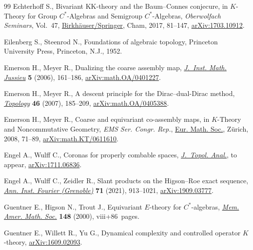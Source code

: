\documentclass[pdftex]{sigma}
\numberwithin{equation}{section}
\theoremstyle{definition}
\begin{document}
\begin{thebibliography}{99}
Echterhoff S., Bivariant {KK}-theory and the {B}aum--{C}onnes conjecure, in
 {$K$}-Theory for Group {$C^*$}-Algebras and Semigroup {$C^*$}-Algebras,
 \textit{Oberwolfach Seminars}, Vol.~47, \href{https://doi.org/10.1007/978-3-319-59915-1_3}{Birkh\"auser/Springer}, Cham, 2017,
 81--147, \href{https://arxiv.org/abs/1703.10912}{arXiv:1703.10912}.

Eilenberg S., Steenrod N., Foundations of algebraic topology, Princeton
 University Press, Princeton, N.J., 1952.

Emerson H., Meyer R., Dualizing the coarse assembly map, \href{https://doi.org/10.1017/S147474800500023X}{\textit{J.~Inst. Math.
 Jussieu}} \textbf{5} (2006), 161--186, \href{https://arxiv.org/abs/math.OA/0401227}{arXiv:math.OA/0401227}.

Emerson H., Meyer R., A descent principle for the {D}irac--dual-{D}irac method,
 \href{https://doi.org/10.1016/j.top.2007.02.001}{\textit{Topology}} \textbf{46} (2007), 185--209, \href{https://arxiv.org/abs/math.OA/0405388}{arXiv:math.OA/0405388}.

Emerson H., Meyer R., Coarse and equivariant co-assembly maps, in {$K$}-Theory
 and Noncommutative Geometry, \textit{EMS Ser. Congr. Rep.}, \href{https://doi.org/10.4171/060-1/3}{Eur. Math. Soc.}, Z\"urich,
 2008, 71--89, \href{https://arxiv.org/abs/math.KT/0611610}{arXiv:math.KT/0611610}.

Engel A., Wulff C., Coronas for properly combable spaces, \href{https://doi.org/10.1142/S1793525321500643}{\textit{J.~Topol.
 Anal.}}, {t}o appear, \href{https://arxiv.org/abs/1711.06836}{arXiv:1711.06836}.

Engel A., Wulff C., Zeidler R., Slant products on the {H}igson--{R}oe exact
 sequence, \href{https://doi.org/10.5802/aif.3406}{\textit{Ann. Inst. Fourier (Grenoble)}} \textbf{71} (2021),
 913--1021, \href{https://arxiv.org/abs/1909.03777}{arXiv:1909.03777}.

Guentner E., Higson N., Trout J., Equivariant {$E$}-theory for
 {$C^*$}-algebras, \href{https://doi.org/10.1090/memo/0703}{\textit{Mem. Amer. Math. Soc.}} \textbf{148} (2000),
 viii+86~pages.

Guentner E., Willett R., Yu G., Dynamical complexity and controlled operator
 {$K$}-theory, \href{https://arxiv.org/abs/1609.02093}{arXiv:1609.02093}.


\end{thebibliography}
\end{document}
